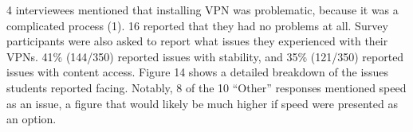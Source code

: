 4 interviewees mentioned that installing VPN was problematic, because it was a
complicated process (1). 16 reported that they had no problems at all. Survey participants were also asked to report what issues they experienced with
their VPNs. 41\% (144/350) reported issues with stability, and 35\% (121/350)
reported issues with content access. Figure 14 shows a detailed breakdown of
the issues students reported facing. Notably, 8 of the 10 “Other” responses
mentioned speed as an issue, a figure that would likely be much higher if
speed were presented as an option.